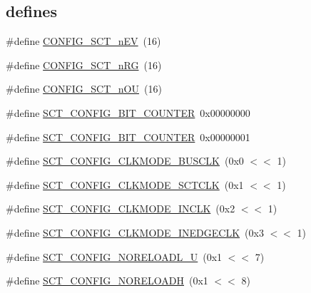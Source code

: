 \subsection*{\textquotesingle{}defines\textquotesingle{}}
\begin{DoxyCompactItemize}
\item 
\#define \hyperlink{group___s_c_t__18_x_x__43_x_x_ga2672a9e7fb27a28b4f2dd7f4468f0010}{C\+O\+N\+F\+I\+G\+\_\+\+S\+C\+T\+\_\+n\+EV}~(16)
\item 
\#define \hyperlink{group___s_c_t__18_x_x__43_x_x_ga8d80e251208a01483a6b00c81ecb7493}{C\+O\+N\+F\+I\+G\+\_\+\+S\+C\+T\+\_\+n\+RG}~(16)
\item 
\#define \hyperlink{group___s_c_t__18_x_x__43_x_x_gab432d85ccb09a5c5d232916c8bb95089}{C\+O\+N\+F\+I\+G\+\_\+\+S\+C\+T\+\_\+n\+OU}~(16)
\item 
\#define \hyperlink{group___s_c_t__18_x_x__43_x_x_ga441708986d2cd57043b0603801c21450}{S\+C\+T\+\_\+\+C\+O\+N\+F\+I\+G\+\_\+B\+I\+T\+\_\+\+C\+O\+U\+N\+T\+ER}~0x00000000
\item 
\#define \hyperlink{group___s_c_t__18_x_x__43_x_x_ga579cb78a05f4c680e9ec5463dc5aeafd}{S\+C\+T\+\_\+\+C\+O\+N\+F\+I\+G\+\_\+B\+I\+T\+\_\+\+C\+O\+U\+N\+T\+ER}~0x00000001
\item 
\#define \hyperlink{group___s_c_t__18_x_x__43_x_x_ga54bd229bccde8e742610b8363d7f7a25}{S\+C\+T\+\_\+\+C\+O\+N\+F\+I\+G\+\_\+\+C\+L\+K\+M\+O\+D\+E\+\_\+\+B\+U\+S\+C\+LK}~(0x0 $<$$<$ 1)
\item 
\#define \hyperlink{group___s_c_t__18_x_x__43_x_x_ga2ef1357ae9969a9a1be753ab199e1aa1}{S\+C\+T\+\_\+\+C\+O\+N\+F\+I\+G\+\_\+\+C\+L\+K\+M\+O\+D\+E\+\_\+\+S\+C\+T\+C\+LK}~(0x1 $<$$<$ 1)
\item 
\#define \hyperlink{group___s_c_t__18_x_x__43_x_x_ga969d9166f635eeaab7fa6873fa2c6cc9}{S\+C\+T\+\_\+\+C\+O\+N\+F\+I\+G\+\_\+\+C\+L\+K\+M\+O\+D\+E\+\_\+\+I\+N\+C\+LK}~(0x2 $<$$<$ 1)
\item 
\#define \hyperlink{group___s_c_t__18_x_x__43_x_x_ga52bfacd5bd4daeda54ef29b9f11e400a}{S\+C\+T\+\_\+\+C\+O\+N\+F\+I\+G\+\_\+\+C\+L\+K\+M\+O\+D\+E\+\_\+\+I\+N\+E\+D\+G\+E\+C\+LK}~(0x3 $<$$<$ 1)
\item 
\#define \hyperlink{group___s_c_t__18_x_x__43_x_x_ga94c6dc388017b5e8038ad1dea8e32a3f}{S\+C\+T\+\_\+\+C\+O\+N\+F\+I\+G\+\_\+\+N\+O\+R\+E\+L\+O\+A\+D\+L\+\_\+U}~(0x1 $<$$<$ 7)
\item 
\#define \hyperlink{group___s_c_t__18_x_x__43_x_x_ga80da6c633fb897af2ee19bded9e43844}{S\+C\+T\+\_\+\+C\+O\+N\+F\+I\+G\+\_\+\+N\+O\+R\+E\+L\+O\+A\+DH}~(0x1 $<$$<$ 8)

\end{DoxyCompactItemize}
